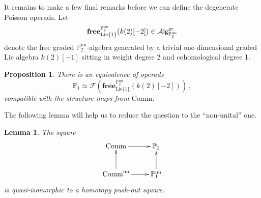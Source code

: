 \documentclass[10pt, oneside]{amsart}
\theoremstyle{plain}
\newtheorem{lemma}[equation]{Lemma}
\newtheorem{proposition}[equation]{Proposition}
\newcommand{\Alg}{\mathcal{A}\text{\sf lg}}
\newcommand{\comm}{\mathrm{Comm}}
\newcommand{\F}{\mathcal{F}}
\newcommand{\Free}{\mathbf{free}}
\newcommand{\gr}{\mathrm{gr}}
\newcommand{\lie}{\mathrm{Lie}}
\renewcommand{\nu}{\mathrm{nu}}
\newcommand{\PP}{\mathbb{P}}
\begin{document}
It remains to make a few final remarks before we can define the degenerate Poisson operads. Let
\begin{equation*}
\Free^{\PP_2^\nu}_{\lie\{1\}} (k(2)[-2]) \in \Alg^\gr_{\PP_2^\nu}
\end{equation*}
denote the free graded
$\PP^\text{nu}_2$-algebra generated by a trivial one-dimensional graded Lie algebra $k(2)[-1]$ sitting in weight degree 2 and 
cohomological degree 1.
\begin{proposition}\label{poisson-operad}
There is an equivalence of operads
\begin{equation*}
\PP_1 \simeq \F(\Free^{\PP_2^\nu}_{\lie\{1\}} (k(2)[-2])) \:,
\end{equation*}
compatible with the structure maps from $\comm$.
\end{proposition}
The following lemma will help us to reduce the question to the ``non-unital'' one.
\begin{lemma}\label{push-out-square}
The square
\[\xymatrix{
\comm \ar[r] & \PP_1 \\
\comm^{\text{nu}} \ar[r]\ar[u] & \PP_1^{\text{nu}} \ar[u]
}\]
is quasi-isomorphic to a homotopy push-out square.
\end{lemma}
\end{document}
